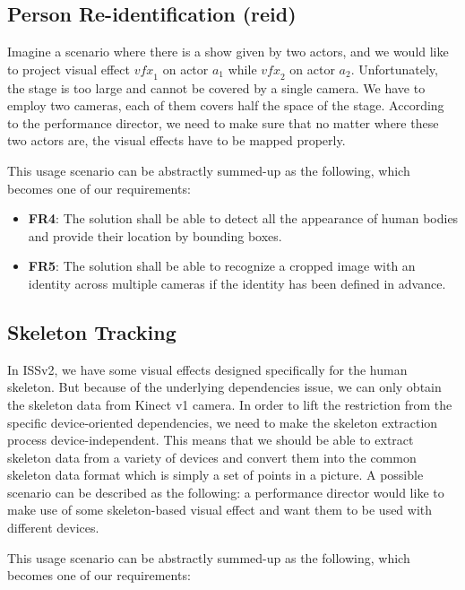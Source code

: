 \subsection{Person Re-identification (\acrshort{reid})}
\label{sec:intro-sq-reid}

Imagine a scenario where there is a show given by two actors, and we would like
to project visual effect $\mathit{vfx}_1$ on actor $a_1$ while $\mathit{vfx}_2$
on actor $a_2$.
Unfortunately, the stage is too large and cannot be covered by a single camera.
We have to employ two cameras, each of them covers half the space of the stage.
According to the performance director, we need to make sure that no matter
where these two actors are, the visual effects have to be mapped properly.

This usage scenario can be abstractly summed-up as the following, which becomes
one of our requirements:

\begin{itemize}
    \item \textbf{FR4}: The solution shall be able to detect all the appearance 
    of human bodies and provide their location by bounding boxes.
    
    \item \textbf{FR5}: The solution shall be able to recognize a cropped image 
    with an identity across multiple cameras if the identity has been defined
    in advance.
\end{itemize}

\subsection{Skeleton Tracking}
\label{sec:intro-sq-skt}

In ISSv2, we have some visual effects designed specifically for the human 
skeleton. But because of the underlying dependencies issue, we can only obtain 
the skeleton data from Kinect v1 camera.
In order to lift the restriction from the specific device-oriented
dependencies, we need to make the skeleton extraction process
device-independent.
This means that we should be able to extract skeleton data from a variety
of devices and convert them into the common skeleton data format which is
simply a set of points in a picture. A possible scenario can be described as
the following: a performance director would like to make use of some
skeleton-based visual effect and want them to be used with different devices.

This usage scenario can be abstractly summed-up as the following, which becomes
one of our requirements:

